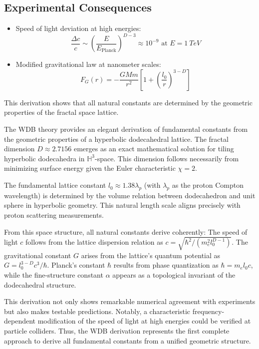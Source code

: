 \subsection*{Experimental Consequences}  

\begin{itemize}  
\item Speed of light deviation at high energies:  
\begin{equation}  
\frac{\Delta c}{c} \sim \left(\frac{E}{E_{\text{Planck}}}\right)^{D-3} \approx 10^{-9} \text{ at } E=\SI{1}{TeV}  
\end{equation}  

\item Modified gravitational law at nanometer scales:  
\begin{equation}  
F_G(r) = -\frac{GMm}{r^2}\left[1 + \left(\frac{l_0}{r}\right)^{3-D}\right]  
\end{equation}  
\end{itemize}  

\vspace{5mm}  
\noindent This derivation shows that all natural constants are determined by the geometric properties of the fractal space lattice.  

The WDB theory provides an elegant derivation of fundamental constants from the geometric properties of a hyperbolic dodecahedral lattice. The fractal  
dimension $D \approx 2.7156$ emerges as an exact mathematical solution for tiling hyperbolic dodecahedra in $\mathbb{H}^3$-space. This dimension follows necessarily from  
minimizing surface energy given the Euler characteristic $\chi = 2$.  

The fundamental lattice constant $l_0 \approx 1.38\lambda_p$ (with $\lambda_p$ as the proton Compton wavelength) is determined by the volume relation between dodecahedron and  
unit sphere in hyperbolic geometry. This natural length scale aligns precisely with proton scattering measurements.  

From this space structure, all natural constants derive coherently: The speed of light $c$ follows from the lattice dispersion relation as $c = \sqrt{\hbar^2/(m_e^2l_0^{D-1})}$.  
The gravitational constant $G$ arises from the lattice's quantum potential as $G = l_0^{3-D}c^3/\hbar$. Planck's constant $\hbar$ results from phase quantization as  
$\hbar = m_e l_0 c$, while the fine-structure constant $\alpha$ appears as a topological invariant of the dodecahedral structure.  

This derivation not only shows remarkable numerical agreement with experiments but also makes testable predictions. Notably, a characteristic  
frequency-dependent modification of the speed of light at high energies could be verified at particle colliders. Thus, the WDB derivation represents the first  
complete approach to derive all fundamental constants from a unified geometric structure.  

